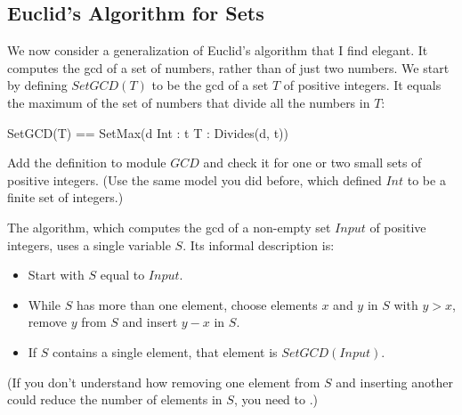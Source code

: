 \documentclass[fleqn,leqno]{article}
\begin{document}
%
\vspace{-\baselineskip}
\subsection{Euclid's Algorithm for Sets}

We now consider a generalization of Euclid's algorithm that I find
elegant.  It computes the gcd of a set of numbers, rather than of just
two numbers.  We start by defining $SetGCD(T)$ to be the gcd of a set
$T$ of positive integers.  It equals the maximum of the set of numbers
that divide all the numbers in $T$:
\begin{display}
\begin{notla}
SetGCD(T) == SetMax({d \in Int : \A t \in T : Divides(d, t)})
\end{notla}\midcol
\begin{tlatex}
\end{tlatex}
\end{display}
Add the definition to module $GCD$ and check it for one or two small
sets of positive integers.  (Use the same model you did before, which
defined $Int$ to be a finite set of integers.)

The algorithm, which computes the gcd of a non-empty set $Input$ of positive
integers, uses a single variable $S$.  Its informal description is:
\begin{itemize}
\item Start with $S$ equal to $Input$.

\item While $S$ has more than one element, choose elements $x$ and $y$
in $S$ with $y > x$, remove $y$ from $S$ and insert $y-x$ in $S$.

\item If $S$ contains a single element, that element is $SetGCD(Input)$.
\end{itemize}
(If you don't understand how removing  one element from $S$ and inserting
another could reduce the number of elements in $S$, you need to
.)
\end{document}
